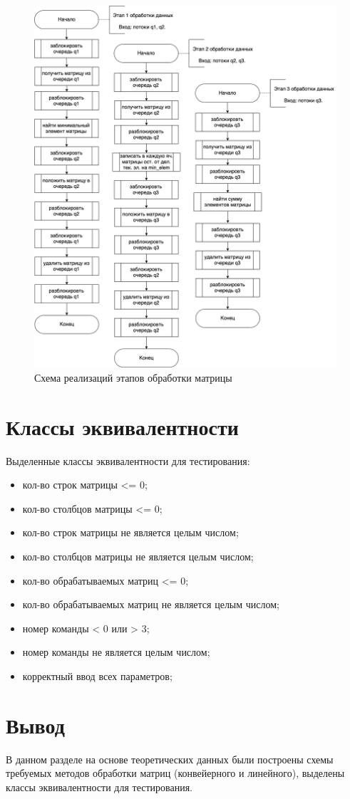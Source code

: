 \begin{figure}[h]
	\centering
	\includegraphics[scale=0.5]{img/stages.png}
	\caption{Схема реализаций этапов обработки матрицы}
	\label{fig:stages}
\end{figure} 

\clearpage

\section{Классы эквивалентности}

Выделенные классы эквивалентности для тестирования:

\begin{itemize}[label=---]
	\item кол-во строк матрицы <= 0;
	\item кол-во столбцов матрицы <= 0;
	\item кол-во строк матрицы не является целым числом;
	\item кол-во столбцов матрицы не является целым числом;
	\item кол-во обрабатываемых матриц <= 0;
	\item кол-во обрабатываемых матриц не является целым числом;
	\item номер команды < 0 или > 3;
	\item номер команды не является целым числом;
	\item корректный ввод всех параметров;
\end{itemize}


\section*{Вывод}

В данном разделе на основе теоретических данных были построены схемы требуемых методов обработки матриц (конвейерного и линейного), выделены классы эквивалентности для тестирования.

\clearpage